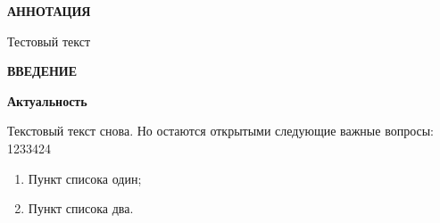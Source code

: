 \newpage
\begin{center}
  \textbf{\large АННОТАЦИЯ}
\end{center}

Тестовый текст

\onehalfspacing
\setcounter{page}{6}

\newpage
\renewcommand{\contentsname}{\centerline{\large СОДЕРЖАНИЕ}}
\tableofcontents

\newpage
\begin{center}
  \textbf{\large ВВЕДЕНИЕ}
\end{center}


\textbf{Актуальность}

Текстовый текст снова.
Но остаются открытыми следующие важные вопросы: 1233424
\begin{enumerate}
\item Пункт списока один;
\item Пункт списока два.
\end{enumerate}

